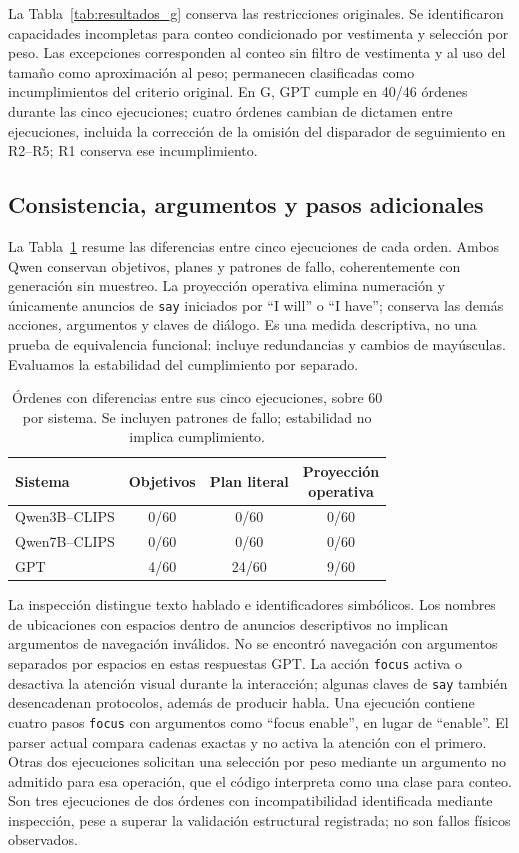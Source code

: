 \documentclass[a4paper,twoside]{article}
\begin{document}
La Tabla~\ref{tab:resultados_g} conserva las restricciones originales. Se identificaron capacidades incompletas para conteo condicionado por vestimenta y selección por peso. Las excepciones corresponden al conteo sin filtro de vestimenta y al uso del tamaño como aproximación al peso; permanecen clasificadas como incumplimientos del criterio original. En G, GPT cumple en 40/46 órdenes durante las cinco ejecuciones; cuatro órdenes cambian de dictamen entre ejecuciones, incluida la corrección de la omisión del disparador de seguimiento en R2--R5; R1 conserva ese incumplimiento.

\subsection{Consistencia, argumentos y pasos adicionales}
La Tabla~\ref{tab:consistencia} resume las diferencias entre cinco ejecuciones de cada orden. Ambos Qwen conservan objetivos, planes y patrones de fallo, coherentemente con generación sin muestreo. La proyección operativa elimina numeración y únicamente anuncios de \texttt{say} iniciados por ``I will'' o ``I have''; conserva las demás acciones, argumentos y claves de diálogo. Es una medida descriptiva, no una prueba de equivalencia funcional: incluye redundancias y cambios de mayúsculas. Evaluamos la estabilidad del cumplimiento por separado.

\begin{table}[htbp]
\centering\small
\caption{Órdenes con diferencias entre sus cinco ejecuciones, sobre 60 por sistema. Se incluyen patrones de fallo; estabilidad no implica cumplimiento.}
\label{tab:consistencia}
\begin{tabularx}{\columnwidth}{@{}lccc@{}}
\toprule
Sistema & Objetivos & Plan literal & \shortstack{Proyección\\operativa} \\
\midrule
Qwen3B--CLIPS & 0/60 & 0/60 & 0/60 \\
Qwen7B--CLIPS & 0/60 & 0/60 & 0/60 \\
GPT & 4/60 & 24/60 & 9/60 \\
\bottomrule
\end{tabularx}
\end{table}


La inspección distingue texto hablado e identificadores simbólicos. Los nombres de ubicaciones con espacios dentro de anuncios descriptivos no implican argumentos de navegación inválidos. No se encontró navegación con argumentos separados por espacios en estas respuestas GPT. La acción \texttt{focus} activa o desactiva la atención visual durante la interacción; algunas claves de \texttt{say} también desencadenan protocolos, además de producir habla. Una ejecución contiene cuatro pasos \texttt{focus} con argumentos como ``focus enable'', en lugar de ``enable''. El parser actual compara cadenas exactas y no activa la atención con el primero. Otras dos ejecuciones solicitan una selección por peso mediante un argumento no admitido para esa operación, que el código interpreta como una clase para conteo. Son tres ejecuciones de dos órdenes con incompatibilidad identificada mediante inspección, pese a superar la validación estructural registrada; no son fallos físicos observados.
\end{document}
